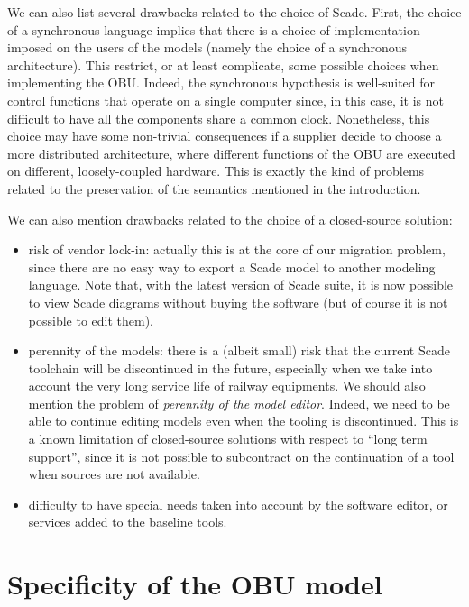 \documentclass{template/openetcs_report}
\begin{document}
We can also list several drawbacks related to the choice of
Scade. First, the choice of a synchronous language implies that there
is a choice of implementation imposed on the users of the models
(namely the choice of a synchronous architecture). This restrict, or
at least complicate, some possible choices when implementing the
OBU. Indeed, the synchronous hypothesis is well-suited for control
functions that operate on a single computer since, in this case, it is
not difficult to have all the components share a common
clock. Nonetheless, this choice may have some non-trivial consequences
if a supplier decide to choose a more distributed architecture, where
different functions of the OBU are executed on different,
loosely-coupled hardware. This is exactly the kind of problems related
to the preservation of the semantics mentioned in the
introduction.

We can also mention drawbacks related to the choice of a closed-source
solution:
\begin{itemize}
\item risk of vendor lock-in: actually this is at the core of our
  migration problem, since there are no easy way to export a Scade
  model to another modeling language. Note that, with the latest
  version of Scade suite, it is now possible to view Scade diagrams
  without buying the software (but of course it is not possible to
  edit them).

\item perennity of the models: there is a (albeit small) risk that the
  current Scade toolchain will be discontinued in the future,
  especially when we take into account the very long service life of
  railway equipments. We should also mention the problem of
  \emph{perennity of the model editor}. Indeed, we need to be able to
  continue editing models even when the tooling is discontinued.  This
  is a known limitation of closed-source solutions with respect to
  ``long term support'', since it is not possible to subcontract on
  the continuation of a tool when sources are not available.

\item difficulty to have special needs taken into account by the
  software editor, or services added to the baseline tools.
\end{itemize}



\section{Specificity of the OBU model}
\end{document}
